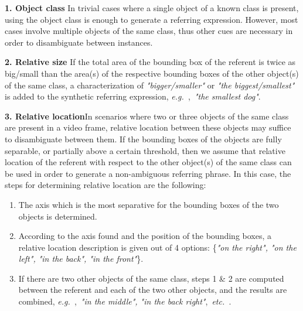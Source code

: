 \documentclass[11pt]{article}
\newcommand{\eg}{\textit{e.g.~}}
\newcommand{\etc}{\textit{etc.~}}
\begin{document}
\noindent
\textbf{1. Object class}
\quad 
In trivial cases where a single object of a known class is present, using the object class is enough to generate a referring expression. However, most cases involve multiple objects of the same class, thus other cues are necessary in order to disambiguate between instances.


\noindent
\textbf{2. Relative size}\quad 
If the total area of the bounding box of the referent is twice as big/small than the area(s) of the respective bounding boxes of the other object(s) of the same class, a characterization of \textit{"bigger/smaller"} or \textit{"the biggest/smallest"} is added to the synthetic referring expression, \eg,~\textit{"the smallest dog"}.

\noindent
\textbf{3. Relative location}\quad In scenarios where two or three objects of the same class are present in a video frame, relative location 
between these objects may suffice 
to disambiguate between them. If the bounding boxes of the objects are fully separable, or partially above a certain threshold, then we assume that relative location of the referent with respect to the other object(s) of the same class can be used in order to generate a non-ambiguous referring phrase. In this case, the steps for determining relative location are the following:

\begin{enumerate}[noitemsep]
    \item The axis which is the most separative for the bounding boxes of the two objects is determined.
    \item According to the axis found and the position of the bounding boxes, a relative location description is given out of 4 options: \{\textit{"on the right", "on the left", "in the back", "in the front"}\}.
    \item If there are two other objects of the same class, steps 1 \& 2 are computed between the referent and each of the two other objects, and the results are combined, \eg,~\textit{"in the middle", "in the back right"},~\etc.
\end{enumerate}
\end{document}
